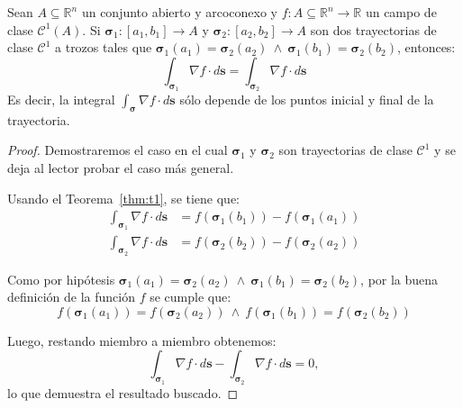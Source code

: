 \begin{corollary}\label{thm:c1} 
Sean $A \subseteq \mathbb{R}^n$ un conjunto abierto y arcoconexo y $f: A \subseteq \mathbb{R}^n \to \mathbb{R}$ un campo de clase $\mathcal{C}^1(A)$. Si $\boldsymbol{\sigma}_1: [a_1,b_1] \to A$ y $\boldsymbol{\sigma}_2: [a_2,b_2] \to A$ son dos trayectorias de clase $\mathcal{C}^{1}$ a trozos tales que $\boldsymbol{\sigma}_1(a_1) = \boldsymbol{\sigma}_2(a_2) \ \land \ \boldsymbol{\sigma}_1(b_1) = \boldsymbol{\sigma}_2(b_2)$, entonces: 
\[ \int_{\boldsymbol{\sigma}_1} \nabla f \cdot d\mathbf{s} = \int_{\boldsymbol{\sigma}_2} \nabla f \cdot d\mathbf{s} \] 
Es decir, la integral $\int_{\boldsymbol{\sigma}} \nabla f \cdot d\mathbf{s}$ sólo depende de los puntos inicial y final de la trayectoria. 
\end{corollary}

\begin{proof}
Demostraremos el caso en el cual $\boldsymbol{\sigma}_1$ y $\boldsymbol{\sigma}_2$ son trayectorias de clase $\mathcal{C}^{1}$ y se deja al lector probar el caso más general. 

Usando el Teorema~\ref{thm:t1}, se tiene que:
\begin{align*} 
\int_{\boldsymbol{\sigma}_1} \nabla f \cdot d\mathbf{s} &= f(\boldsymbol{\sigma}_1(b_1)) - f(\boldsymbol{\sigma}_1(a_1)) \\ 
\int_{\boldsymbol{\sigma}_2} \nabla f \cdot d\mathbf{s} &= f(\boldsymbol{\sigma}_2(b_2)) - f(\boldsymbol{\sigma}_2(a_2)) 
\end{align*} 

Como por hipótesis $\boldsymbol{\sigma}_1(a_1) = \boldsymbol{\sigma}_2(a_2) \ \land \ \boldsymbol{\sigma}_1(b_1) = \boldsymbol{\sigma}_2(b_2)$, por la buena definición de la función $f$ se cumple que: 
\begin{equation*} 
f(\boldsymbol{\sigma}_1(a_1)) = f(\boldsymbol{\sigma}_2(a_2)) \ \land \ f(\boldsymbol{\sigma}_1(b_1)) = f(\boldsymbol{\sigma}_2(b_2)) 
\end{equation*} 

Luego, restando miembro a miembro obtenemos:
\begin{equation*} 
\int_{\boldsymbol{\sigma}_1} \nabla f \cdot d\mathbf{s} - \int_{\boldsymbol{\sigma}_2} \nabla f \cdot d\mathbf{s} = 0,
\end{equation*} 
lo que demuestra el resultado buscado. 
\end{proof}







